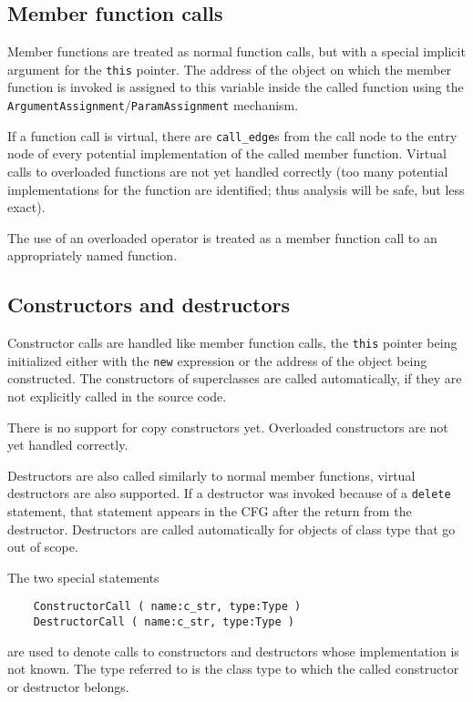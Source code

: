 \documentclass[12pt]{article}
\begin{document}
\subsection{Member function calls}

Member functions are treated as normal function calls, but with a
special implicit argument for the \lstinline|this| pointer. The
address of the object on which the member function is invoked is
assigned to this variable inside the called function using the
\verb|ArgumentAssignment|/\verb|ParamAssignment| mechanism.

If a function call is virtual, there are \verb|call_edge|s from the
call node to the entry node of every potential implementation of
the called member function. Virtual calls to overloaded functions
are not yet handled correctly (too many potential implementations
for the function are identified; thus analysis will be safe, but
less exact).

The use of an overloaded operator is treated as a member function
call to an appropriately named function.

\subsection{Constructors and destructors}

Constructor calls are handled like member function calls, the
\lstinline|this| pointer being initialized either with the
\lstinline|new| expression or the address of the object being
constructed. The constructors of superclasses are called
automatically, if they are not explicitly called in the source code.

There is no support for copy constructors yet. Overloaded
constructors are not yet handled correctly.

Destructors are also called similarly to normal member functions,
virtual destructors are also supported. If a destructor was invoked
because of a \lstinline|delete| statement, that statement appears in
the CFG after the return from the destructor. Destructors are called
automatically for objects of class type that go out of scope.

The two special statements
\begin{verbatim}
    ConstructorCall ( name:c_str, type:Type )
    DestructorCall ( name:c_str, type:Type )
\end{verbatim}
are used to denote calls to constructors and destructors whose
implementation is not known. The type referred to is the class type
to which the called constructor or destructor belongs.
\end{document}
